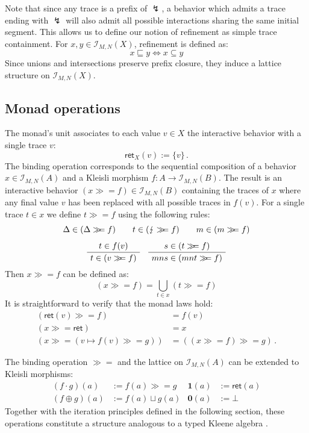 \documentclass[acmsmall,timestamp,review,anonymous]{acmart}
\newcommand{\kw}[1]{\ensuremath{ \mathsf{#1} }}
\newcommand{\bind}{\gg\!\!=}
\begin{document}
Note that since any trace is a prefix of $\lightning$,
a behavior which admits a trace ending with $\lightning$
will also admit all possible interactions
sharing the same initial segment.
This allows us to define our notion of refinement
as simple trace containment.
For $x, y \in \mathcal{I}_{M,N}(X)$, refinement is defined as:
\[
    x \sqsubseteq y \Leftrightarrow x \subseteq y
\]
Since unions and intersections
preserve prefix closure,
they induce a lattice structure on $\mathcal{I}_{M,N}(X)$.


\subsection{Monad operations} %

The monad's unit associates to each value $v \in X$
the interactive behavior with a single trace $v$:
\[
    \kw{ret}_X(v) := \{ v \} \,.
\]
The binding operation corresponds to
the sequential composition of
a behavior $x \in \mathcal{I}_{M,N}(A)$ and
a Kleisli morphism $f : A \rightarrow \mathcal{I}_{M,N}(B)$.
The result is an interactive behavior
$(x \bind f) \in \mathcal{I}_{M,N}(B)$
containing the traces of $x$ where
any final value $v$ has been replaced with
all possible traces in $f(v)$.
For a single trace $t \in x$ we define $t \bind f$
using the following rules:
\begin{gather*}
  \Delta \in (\Delta \bind f)
  \qquad
  t \in (\lightning \bind f)
  \qquad
  m \in (m \bind f)
  \\[1ex]
  \AxiomC{$t \in f(v)$}
  \UnaryInfC{$t \in (v \bind f)$}
  \DisplayProof
  \quad
  \AxiomC{$s \in (t \bind f)$}
  \UnaryInfC{$mns \in (mnt \bind f)$}
  \DisplayProof
\end{gather*}
Then $x \bind f$ can be defined as:
\[
    (x \bind f) = \bigcup_{t \in x} (t \bind f)
\]
It is straightforward to verify that
the monad laws hold:
\begin{align*}
  (\kw{ret}(v) \bind f) &= f(v) \\
  (x \bind \kw{ret}) &= x \\
  (x \bind (v \mapsto f(v) \bind g)) &= ((x \bind f) \bind g) \,.
\end{align*}

The binding operation $\bind$
and the lattice on $\mathcal{I}_{M,N}(A)$
can be extended to Kleisli morphisms:
\begin{align*}
    (f \cdot g)(a) &:= f(a) \bind g &
    \mathbf{1}(a) &:= \kw{ret}(a) \\
    (f \oplus g)(a) &:= f(a) \sqcup g(a) &
    \mathbf{0}(a) &:= \bot
\end{align*}
Together with the iteration principles
defined in the following section,
these operations constitute a structure
analogous to a typed Kleene algebra \cite{tka}.
\end{document}

